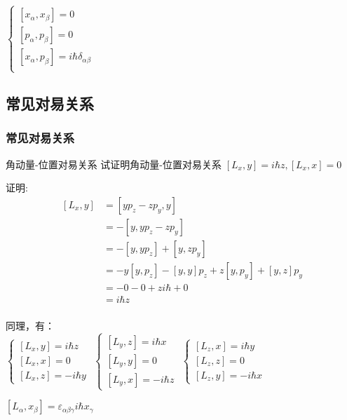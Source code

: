 \begin{frame}  
    \begin{tcolorbox4}[量子力学基本对易关系]
    $\begin{cases}
        [x_\alpha,x_\beta]= 0  \\ 
        [p_\alpha,p_\beta]= 0  \\ 
        [x_\alpha,p_\beta]= i\hbar \delta_{\alpha\beta}  \\ 
    \end{cases}$
    \end{tcolorbox4}
\end{frame} 

\subsection{常见对易关系}

\begin{frame}
    \frametitle{常见对易关系}
    \begin{tcolorbox1}{角动量-位置对易关系}
        试证明角动量-位置对易关系 $[L_x,y] = i\hbar z,  [L_x,x] = 0 $
    \end{tcolorbox1}
    \alert{证明:} 
    \begin{equation*}
        \begin{split}
        [L_x,y]&= [yp_z-zp_y,y]\\
        &=-[y,yp_z-zp_y]\\
        &= -[y,yp_z] + [y,zp_y]\\
        &=-y[y,p_z] -[y,y]p_z + z[y,p_y] + [y,z]p_y\\
        &=-0 -0 + z i\hbar + 0\\
        &=i\hbar z \\
        \end{split}  
    \end{equation*}
\end{frame} 

\begin{frame}

    同理，有：\\
    $\begin{cases}
        [L_x,y]= i\hbar z  \\ 
        [L_x,x]= 0  \\ 
        [L_x,z]= -i\hbar y 
    \end{cases}$
    $\begin{cases}
        [L_y,z]= i\hbar x  \\ 
        [L_y,y]= 0  \\ 
        [L_y,x]= -i\hbar z 
    \end{cases}$
    $\begin{cases}
        [L_z,x]= i\hbar y  \\ 
        [L_z,z]= 0  \\ 
        [L_z,y]= -i\hbar x 
    \end{cases}$
    \begin{tcolorbox4}
        $ [L_\alpha,x_\beta]= \varepsilon_{\alpha\beta\gamma} i\hbar x_\gamma $ 
    \end{tcolorbox4}
\end{frame} 

